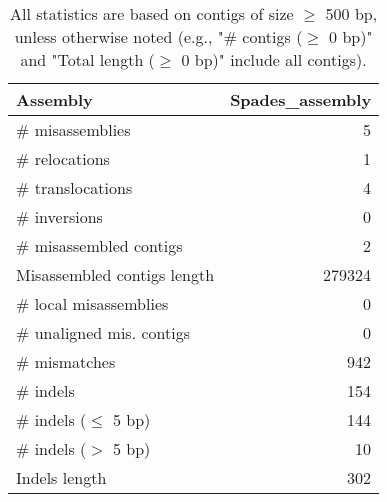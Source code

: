 \documentclass[12pt,a4paper]{article}
\begin{document}
\begin{table}[ht]
\begin{center}
\caption{All statistics are based on contigs of size $\geq$ 500 bp, unless otherwise noted (e.g., "\# contigs ($\geq$ 0 bp)" and "Total length ($\geq$ 0 bp)" include all contigs).}
\begin{tabular}{|l*{1}{|r}|}
\hline
Assembly & Spades\_assembly \\ \hline
\# misassemblies & 5 \\ \hline
\hspace{5mm}\# relocations & 1 \\ \hline
\hspace{5mm}\# translocations & 4 \\ \hline
\hspace{5mm}\# inversions & 0 \\ \hline
\# misassembled contigs & 2 \\ \hline
Misassembled contigs length & 279324 \\ \hline
\# local misassemblies & 0 \\ \hline
\# unaligned mis. contigs & 0 \\ \hline
\# mismatches & 942 \\ \hline
\# indels & 154 \\ \hline
\hspace{5mm}\# indels ($\leq$ 5 bp) & 144 \\ \hline
\hspace{5mm}\# indels ($>$ 5 bp) & 10 \\ \hline
Indels length & 302 \\ \hline
\end{tabular}
\end{center}
\end{table}
\end{document}
